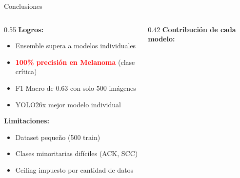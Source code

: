 \documentclass[aspectratio=169]{beamer}
\begin{document}
\begin{frame}{Conclusiones}

    \begin{columns}[T]
        \begin{column}{0.55\textwidth}
            \textbf{Logros:}
            \begin{itemize}
                \item Ensemble supera a modelos individuales
                \item \textcolor{red}{\textbf{100\% precisión en Melanoma}} (clase crítica)
                \item F1-Macro de 0.63 con solo 500 imágenes
                \item YOLO26x mejor modelo individual
            \end{itemize}

            \vspace{0.4cm}
            \textbf{Limitaciones:}
            \begin{itemize}
                \item Dataset pequeño (500 train)
                \item Clases minoritarias difíciles (ACK, SCC)
                \item Ceiling impuesto por cantidad de datos
            \end{itemize}
        \end{column}

        \begin{column}{0.42\textwidth}
            \textbf{Contribución de cada modelo:}

            \vspace{0.3cm}
            \begin{center}
            \end{center}


\end{column}
\end{columns}
\end{frame}
\end{document}
